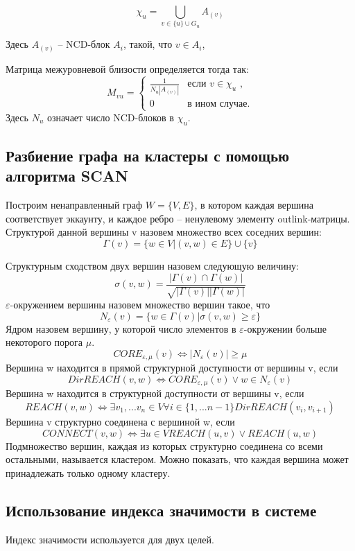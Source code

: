 \documentclass[a4paper,12pt]{article}
\begin{document}
$$
\chi_u = \bigcup_{v \in \{u\} \cup G_u} A_{(v)}
$$

Здесь $A_{(v)}$ -- NCD-блок $A_i$, такой, что $v \in A_i$, 

Матрица межуровневой близости определяется тогда так:
$$
M_{vu}=\begin{cases}
 \frac{1}{N_u |A_{(v)}|}
 & \text{если $v \in \chi_u$ ,}\\
 0 & \text{в ином случае.}
\end{cases}
$$
Здесь $N_u$ означает число NCD-блоков в $\chi_u$.

\subsection{Разбиение графа на кластеры с помощью алгоритма SCAN}
Построим ненаправленный граф $W = \{V, E\}$, в котором каждая вершина соответствует эккаунту, и каждое ребро – ненулевому элементу outlink-матрицы.
Структурой данной вершины v назовем множество всех соседних вершин:
$$
\Gamma(v)=\{w \in V|(v,w) \in E\} \cup \{v\}
$$

Структурным сходством двух вершин назовем следующую величину:
$$
\sigma(v,w)=\frac{ |\Gamma(v) \cap \Gamma(w)|}{\sqrt{|\Gamma(v)||\Gamma(w)|}}
$$
$\varepsilon$-окружением вершины назовем множество вершин такое, что
$$
N_{\varepsilon}(v) = \{ w \in \Gamma(v) | \sigma(v,w) \ge \varepsilon \}
$$
Ядром назовем вершину, у которой число элементов в $\varepsilon$-окружении больше некоторого порога $\mu$.
$$
CORE_{\varepsilon,\mu}(v) \Leftrightarrow |N_{\varepsilon} (v)| \ge \mu
$$
Вершина w находится в прямой структурной доступности от вершины v, если
$$
DirREACH(v,w) \Leftrightarrow CORE_{\varepsilon,\mu}(v) \vee w \in N_{\varepsilon}(v)
$$
Вершина w находится в структурной доступности от вершины v, если
$$
REACH(v,w) \Leftrightarrow \exists v_1,...v_n \in V \forall i \in \{1,...n-1\}DirREACH(v_i,v_{i+1})
$$
Вершина v структурно соединена с вершиной w, если
$$
CONNECT(v,w) \Leftrightarrow \exists u \in V REACH(u,v) \vee REACH(u,w)
$$
Подмножество вершин, каждая из которых структурно соединена со всеми остальными, называется кластером. Можно показать, что каждая вершина может принадлежать только одному кластеру.

\subsection{Использование индекса значимости в системе}
Индекс значимости используется для двух целей. 
\end{document}

